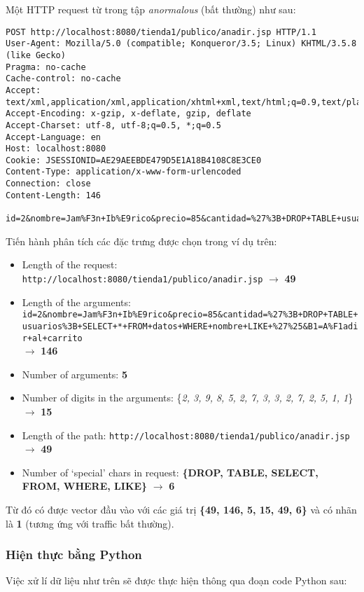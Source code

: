 \documentclass[../main-report.tex]{subfiles}
\begin{document}
\begin{example}
Một HTTP request từ trong tập \emph{anormalous} (bất thường) như sau:

\begin{lstlisting}
POST http://localhost:8080/tienda1/publico/anadir.jsp HTTP/1.1
User-Agent: Mozilla/5.0 (compatible; Konqueror/3.5; Linux) KHTML/3.5.8 (like Gecko)
Pragma: no-cache
Cache-control: no-cache
Accept: text/xml,application/xml,application/xhtml+xml,text/html;q=0.9,text/plain;q=0.8,image/png,*/*;q=0.5
Accept-Encoding: x-gzip, x-deflate, gzip, deflate
Accept-Charset: utf-8, utf-8;q=0.5, *;q=0.5
Accept-Language: en
Host: localhost:8080
Cookie: JSESSIONID=AE29AEEBDE479D5E1A18B4108C8E3CE0
Content-Type: application/x-www-form-urlencoded
Connection: close
Content-Length: 146

id=2&nombre=Jam%F3n+Ib%E9rico&precio=85&cantidad=%27%3B+DROP+TABLE+usuarios%3B+SELECT+*+FROM+datos+WHERE+nombre+LIKE+%27%25&B1=A%F1adir+al+carrito
\end{lstlisting}
\end{example} 

Tiến hành phân tích các đặc trưng được chọn trong ví dụ trên:

\begin{itemize}
\item Length of the request: \lstinline{http://localhost:8080/tienda1/publico/anadir.jsp}{} $\to$ \textbf{49}
\item Length of the arguments: \lstinline{id=2&nombre=Jam%F3n+Ib%E9rico&precio=85&cantidad=%27%3B+DROP+TABLE+usuarios%3B+SELECT+*+FROM+datos+WHERE+nombre+LIKE+%27%25&B1=A%F1adir+al+carrito}{}\\ $\to$ \textbf{146}
\item Number of arguments: \textbf{5}
\item Number of digits in the arguments: \{\emph{2, 3, 9, 8, 5, 2, 7, 3, 3, 2, 7, 2, 5, 1, 1}\} $\to$ \textbf{15}
\item Length of the path: \lstinline{http://localhost:8080/tienda1/publico/anadir.jsp} $\to$ \textbf{49}
\item Number of `special' chars in request: \textbf{\{DROP, TABLE, SELECT, FROM, WHERE, LIKE\}} $\to$ \textbf{6}
\end{itemize}

Từ đó có được vector đầu vào với các giá trị \textbf{\{49, 146, 5, 15, 49, 6\}} và có nhãn là \textbf{1} (tương ứng với traffic bất thường).

\subsubsection*{Hiện thực bằng Python}
Việc xử lí dữ liệu như trên sẽ được thực hiện thông qua đoạn code Python sau:
\end{document}
